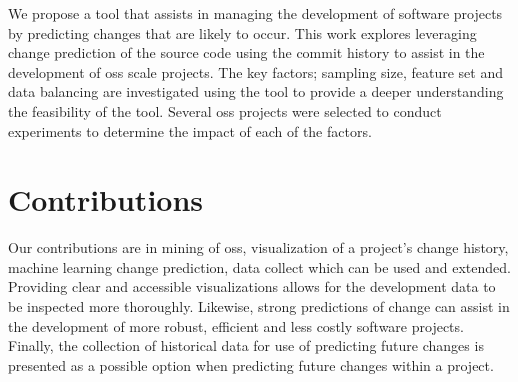 

We propose a tool that assists in managing the development of software projects by predicting changes that are likely to occur. This work explores leveraging change prediction of the source code using the commit history to assist in the development of \gls{oss} scale projects. The key factors; sampling size, feature set and data balancing are investigated using the tool to provide a deeper understanding the feasibility of the tool. Several \gls{oss} projects were selected to conduct experiments to determine the impact of each of the factors.

\section{Contributions}

Our contributions are in mining of \gls{oss}, visualization of a project's change history, machine learning change prediction, data collect which can be used and extended. Providing clear and accessible visualizations allows for the development data to be inspected more thoroughly. Likewise, strong predictions of change can assist in the development of more robust, efficient and less costly software projects. Finally, the collection of historical data for use of predicting future changes is presented as a possible option when predicting future changes within a project.

